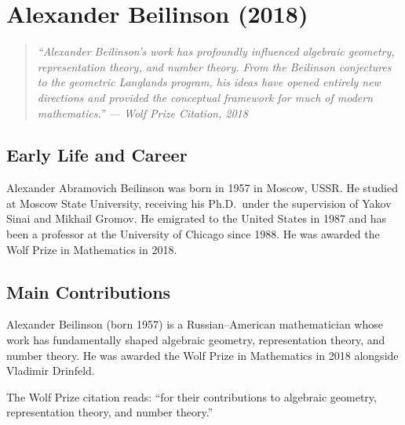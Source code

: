 \providecommand{\Loc}{\operatorname{Loc}}
\providecommand{\Bun}{\operatorname{Bun}}

\chapter{Alexander Beilinson (2018)}

\begin{quote}
\it ``Alexander Beilinson's work has profoundly influenced algebraic geometry, representation theory, and number theory. From the Beilinson conjectures to the geometric Langlands program, his ideas have opened entirely new directions and provided the conceptual framework for much of modern mathematics.'' --- Wolf Prize Citation, 2018
\end{quote}

\section{Early Life and Career}

Alexander Abramovich Beilinson was born in 1957 in Moscow, USSR. He studied at Moscow State University, receiving his Ph.D.\ under the supervision of Yakov Sinai and Mikhail Gromov. He emigrated to the United States in 1987 and has been a professor at the University of Chicago since 1988. He was awarded the Wolf Prize in Mathematics in 2018.

\section{Main Contributions}

Alexander Beilinson (born 1957) is a Russian--American mathematician whose work has fundamentally shaped algebraic geometry, representation theory, and number theory. He was awarded the Wolf Prize in Mathematics in 2018 alongside Vladimir Drinfeld.

The Wolf Prize citation reads: ``for their contributions to algebraic geometry, representation theory, and number theory.''

